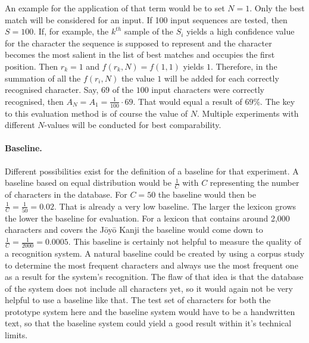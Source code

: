 An example for the application of that term would be to set \(N = 1\).
Only the best match will be considered for an input.
If 100 input sequences are tested, then \(S=100\). 
If, for example, the \(k^{th}\) sample of the \(S_{i}\) yields a high 
confidence value for the character the sequence is supposed to represent and 
the character becomes the most salient in the list of best matches
and occupies the first position. Then \(r_{k} = 1\) and \(f(r_{k},N) = f(1,1)\) 
yields \(1\).
Therefore, in the summation of all the \(f(r_{i},N)\) the value \(1\) 
will be added for each correctly recognised character.
Say, \(69\) of the \(100\) input characters were correctly recognised,
then \(A_{N} = A_{1} = \frac{1}{100} \cdot 69\). That would equal a 
result of \(69\%\). The key to this evaluation method is of course the 
value of \(N\). Multiple experiments with different \(N\)-values will be 
conducted for best comparability.

\paragraph{Baseline.} Different possibilities exist for the definition of a 
baseline for that experiment. A baseline based on equal distribution would 
be \(\frac{1}{C}\) with \(C\) representing the number of characters 
in the database. 
For \(C = 50\) the baseline would then be \(\frac{1}{C} = \frac{1}{50} = 0.02\).
That is already a very low baseline. The larger the lexicon grows the
lower the baseline for evaluation. For a lexicon that contains around 2,000 
characters and covers the Jōyō Kanji the baseline would come down to
\(\frac{1}{C} = \frac{1}{2000} = 0.0005\).
This baseline is certainly not helpful to measure the quality of a 
recognition system. A natural baseline could be created by using 
a corpus study to determine the most frequent characters and always use
the most frequent one as a result for the system's recognition.
The flaw of that idea is that the database of the system does not
include all characters yet, so it would again not be very helpful to use
a baseline like that. The test set of characters for both the prototype
system here and the baseline system would have to be 
a handwritten text, so that the baseline system could yield a good result
within it's technical limits.

